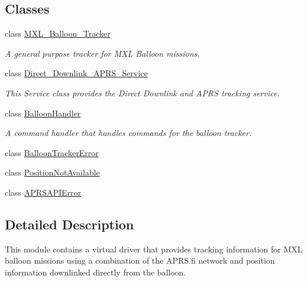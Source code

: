 \subsection*{Classes}
\begin{DoxyCompactItemize}
\item 
class \hyperlink{classhwm_1_1hardware_1_1devices_1_1drivers_1_1mxl__balloon__tracker_1_1mxl__balloon__tracker_1_1_m_x_l___balloon___tracker}{M\-X\-L\-\_\-\-Balloon\-\_\-\-Tracker}
\begin{DoxyCompactList}\small\item\em A general purpose tracker for M\-X\-L Balloon missions. \end{DoxyCompactList}\item 
class \hyperlink{classhwm_1_1hardware_1_1devices_1_1drivers_1_1mxl__balloon__tracker_1_1mxl__balloon__tracker_1_1e3a9bc8b0b4bc235d39c93a5b84975bc}{Direct\-\_\-\-Downlink\-\_\-\-A\-P\-R\-S\-\_\-\-Service}
\begin{DoxyCompactList}\small\item\em This Service class provides the Direct Downlink and A\-P\-R\-S tracking service. \end{DoxyCompactList}\item 
class \hyperlink{classhwm_1_1hardware_1_1devices_1_1drivers_1_1mxl__balloon__tracker_1_1mxl__balloon__tracker_1_1_balloon_handler}{Balloon\-Handler}
\begin{DoxyCompactList}\small\item\em A command handler that handles commands for the balloon tracker. \end{DoxyCompactList}\item 
class \hyperlink{classhwm_1_1hardware_1_1devices_1_1drivers_1_1mxl__balloon__tracker_1_1mxl__balloon__tracker_1_1_balloon_tracker_error}{Balloon\-Tracker\-Error}
\item 
class \hyperlink{classhwm_1_1hardware_1_1devices_1_1drivers_1_1mxl__balloon__tracker_1_1mxl__balloon__tracker_1_1_position_not_available}{Position\-Not\-Available}
\item 
class \hyperlink{classhwm_1_1hardware_1_1devices_1_1drivers_1_1mxl__balloon__tracker_1_1mxl__balloon__tracker_1_1_a_p_r_s_a_p_i_error}{A\-P\-R\-S\-A\-P\-I\-Error}
\end{DoxyCompactItemize}


\subsection{Detailed Description}
This module contains a virtual driver that provides tracking information for M\-X\-L balloon missions using a combination of the A\-P\-R\-S.\-fi network and position information downlinked directly from the balloon. 